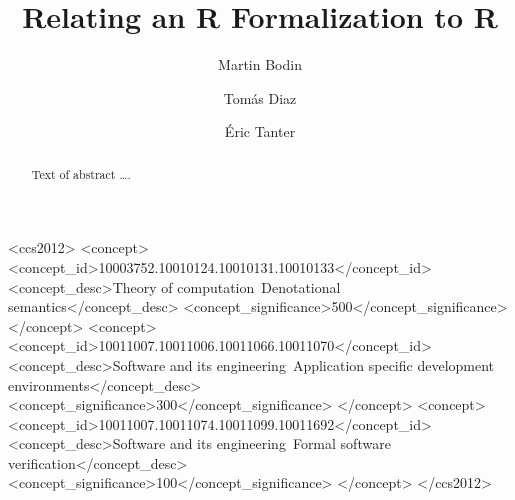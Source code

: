 \documentclass[
    sigplan,
    10pt,
    review, %
    natbib=false %
 ]{acmart}
\begin{document}
\title{Relating an R Formalization to R} %

\author{Martin Bodin}

\author{Tomás Diaz}

\author{Éric Tanter}

\begin{abstract}
Text of abstract \ldots.
\end{abstract}

\begin{CCSXML}
  <ccs2012>
    <concept>
      <concept_id>10003752.10010124.10010131.10010133</concept_id>
      <concept_desc>Theory of computation~Denotational semantics</concept_desc>
      <concept_significance>500</concept_significance>
    </concept>
    <concept>
      <concept_id>10011007.10011006.10011066.10011070</concept_id>
      <concept_desc>Software and its engineering~Application specific development environments</concept_desc>
      <concept_significance>300</concept_significance>
    </concept>
    <concept>
      <concept_id>10011007.10011074.10011099.10011692</concept_id>
      <concept_desc>Software and its engineering~Formal software verification</concept_desc>
      <concept_significance>100</concept_significance>
    </concept>
  </ccs2012>
\end{CCSXML}

\end{document}
